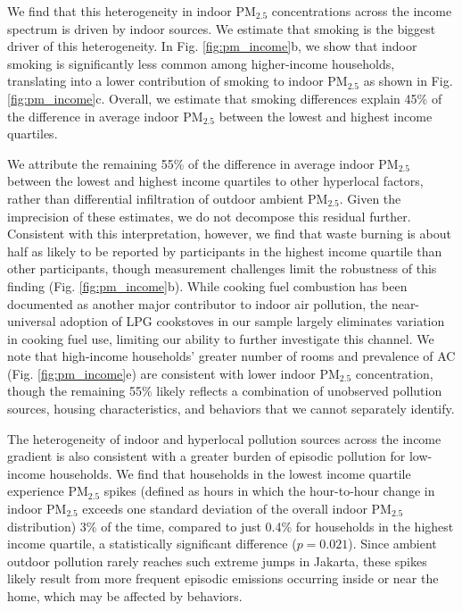 \documentclass[9pt,twocolumn,twoside]{pnas-new}
\begin{document}
We find that this heterogeneity in indoor PM$_{2.5}$ concentrations across the income spectrum is driven by indoor sources. We estimate that smoking is the biggest driver of this heterogeneity. In Fig. \ref{fig:pm_income}b, we show that indoor smoking is significantly less common among higher-income households, translating into a lower contribution of smoking to indoor PM$_{2.5}$ as shown in Fig. \ref{fig:pm_income}c. Overall, we estimate that smoking differences explain 45\% of the difference in average indoor PM$_{2.5}$ between the lowest and highest income quartiles.

We attribute the remaining 55\% of the difference in average indoor PM$_{2.5}$ between the lowest and highest income quartiles to other hyperlocal factors, rather than differential infiltration of outdoor ambient PM$_{2.5}$. Given the imprecision of these estimates, we do not decompose this residual further. Consistent with this interpretation, however, we find that waste burning is about half as likely to be reported by participants in the highest income quartile than other participants, though measurement challenges limit the robustness of this finding (Fig. \ref{fig:pm_income}b). While cooking fuel combustion has been documented as another major contributor to indoor air pollution, the near-universal adoption of LPG cookstoves in our sample largely eliminates variation in cooking fuel use, limiting our ability to further investigate this channel. We note that high-income households’ greater number of rooms and prevalence of AC (Fig. \ref{fig:pm_income}e) are consistent with lower indoor PM$_{2.5}$ concentration, though the remaining 55\% likely reflects a combination of unobserved pollution sources, housing characteristics, and behaviors that we cannot separately identify.

The heterogeneity of indoor and hyperlocal pollution sources across the income gradient is also consistent with a greater burden of episodic pollution for low-income households. We find that households in the lowest income quartile experience PM$_{2.5}$ spikes (defined as hours in which the hour-to-hour change in indoor PM$_{2.5}$ exceeds one standard deviation of the overall indoor PM$_{2.5}$ distribution) 3\% of the time, compared to just 0.4\% for households in the highest income quartile, a statistically significant difference ($p = 0.021$). Since ambient outdoor pollution rarely reaches such extreme jumps in Jakarta, these spikes likely result from more frequent episodic emissions occurring inside or near the home, which may be affected by behaviors.
\end{document}
